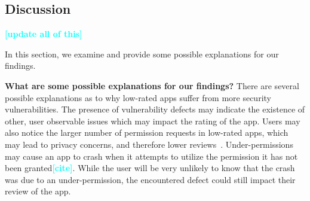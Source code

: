 \documentclass{sig-alternate-05-2015}
\newcommand{\todo}[1]{\textcolor{cyan}{\textbf{[#1]}}}
\begin{document}





\subsection{Discussion}
\todo{update all of this}



In this section, we examine and provide some possible explanations for our findings.




\textbf{What are some possible explanations for our findings?} There are several possible explanations as to why low-rated apps suffer from more security vulnerabilities. The presence of vulnerability defects may indicate the existence of other, user observable issues which may impact the rating of the app. Users may also notice the larger number of permission requests in low-rated apps, which may lead to privacy concerns, and therefore lower reviews~\cite{Lin:2012:EPU:2370216.2370290}. Under-permissions may cause an app to crash when it attempts to utilize the permission it has not been granted\todo{cite}. While the user will be very unlikely to know that the crash was due to an under-permission, the encountered defect could still impact their review of the app.
\end{document}
